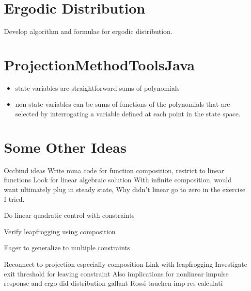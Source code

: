 \documentclass[12pt]{article}
\begin{document}
\section{Ergodic Distribution}
\label{sec:ergodic-distribution}

Develop algorithm and formulae for ergodic distribution.

\appendix
\section{ProjectionMethodToolsJava}
\label{sec:proj}

\begin{itemize}
\item state variables are straightforward sums of polynomials
\item non state variables can be sums of functions of the polynomials that are selected by interrogating a variable defined at each point in the state space.
\end{itemize}









\section{Some Other Ideas}
\label{sec:some-other-ideas}

Occbind ideas
Write mma code for function composition, restrict to linear functions Look for linear algebraic solution With infinite composition, would want ultimately plug in steady state, Why didn't linear go to zero in the exercise I tried.

Do linear quadratic control with constraints

Verify leapfrogging using composition


Eager to generalize to multiple constraints

Reconnect to projection especially composition Link with leapfrogging Investigate exit threshold for leaving constraint Also implications for nonlinear impulse response and ergo did distribution gallant Rossi tauchen imp res calculati
\end{document}
